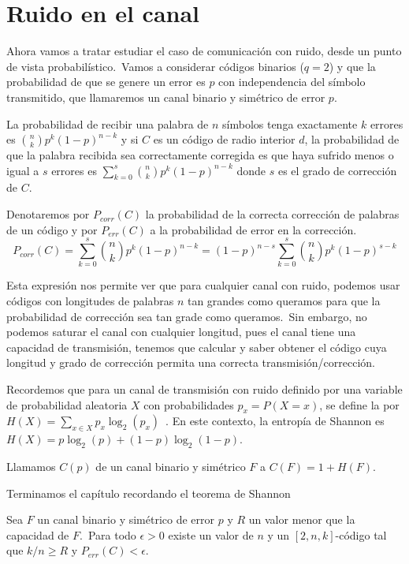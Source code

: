 \section{Ruido en el canal}
Ahora vamos a tratar estudiar el caso de comunicación con ruido, desde un punto de vista probabilístico.\ Vamos a considerar códigos binarios ($q=2$) y que la probabilidad de que se genere un error es $p$ con independencia del símbolo transmitido, que llamaremos un canal binario y simétrico de error $p$.

La probabilidad de recibir una palabra de $n$ símbolos tenga exactamente $k$ errores es $\binom{n}{k}p^k(1-p)^{n-k}$ y si $C$ es un código de radio interior $d$, la probabilidad de que la palabra recibida sea correctamente corregida es que haya sufrido menos o igual a $s$ errores es $\sum_{k=0}^s \binom{n}{k} p^k(1-p)^{n-k}$ donde $s$ es el grado de corrección de $C$.

Denotaremos por $P_{corr}(C)$ la probabilidad de la correcta corrección de palabras de un código y por $P_{err}(C)$ a la probabilidad de error en la corrección.
\[
	P_{corr}(C) = \sum_{k=0}^s \binom{n}{k} p^k(1-p)^{n-k}=(1-p)^{n-s}\sum_{k=0}^s \binom{n}{k} p^k(1-p)^{s-k}
\]

Esta expresión nos permite ver que para cualquier canal con ruido, podemos usar códigos con longitudes de palabras $n$ tan grandes como queramos para que la probabilidad de corrección sea tan grade como queramos.\ Sin embargo, no podemos saturar el canal con cualquier longitud, pues el canal tiene una capacidad de transmisión, tenemos que calcular y saber obtener el código cuya longitud y grado de corrección permita una correcta transmisión/corrección.

Recordemos que para un canal de transmisión con ruido definido por una variable de probabilidad aleatoria $X$ con probabilidades $p_x=P(X=x)$, se define la  por $H(X)=\sum_{x\in X}p_x \log_2(p_x)$~\cite{shannon}.
En este contexto, la entropía de Shannon es $H(X)=p \log_2(p) + (1-p) \log_2(1-p)$.

\begin{definition}
	Llamamos  $C(p)$ de un canal binario y simétrico $F$ a $C(F)=1+H(F)$.
\end{definition}

Terminamos el capítulo recordando el teorema de Shannon
\begin{lemma}
	Sea $F$ un canal binario y simétrico de error $p$ y $R$ un valor menor que la capacidad de $F$.\ Para todo $\epsilon>0$ existe un valor de $n$ y un $[2, n, k]$-código tal que $k/n\geq R$ y $P_{err}(C)<\epsilon$.
\end{lemma}